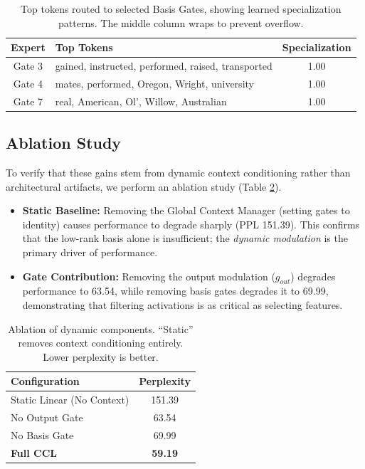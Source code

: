 \documentclass[11pt]{article}
\begin{document}
\begin{table}[t]
\centering
\small %
\caption{Top tokens routed to selected Basis Gates, showing learned specialization patterns. The middle column wraps to prevent overflow.}
\label{tab:gate_specialization}
\begin{tabularx}{\linewidth}{@{} c X c @{}}
\toprule
\textbf{Expert} & \textbf{Top Tokens} & \textbf{Specialization} \\
\midrule
Gate 3 & gained, instructed, performed, raised, transported & 1.00 \\
Gate 4 & mates, performed, Oregon, Wright, university & 1.00 \\
Gate 7 & real, American, Ol', Willow, Australian & 1.00 \\
\bottomrule
\end{tabularx}
\end{table}


\subsection{Ablation Study}
To verify that these gains stem from dynamic context conditioning rather than architectural artifacts, we perform an ablation study (Table \ref{tab:ablation}).
\begin{itemize}
    \item \textbf{Static Baseline:} Removing the Global Context Manager (setting gates to identity) causes performance to degrade sharply (PPL 151.39). This confirms that the low-rank basis alone is insufficient; the \textit{dynamic modulation} is the primary driver of performance.
    \item \textbf{Gate Contribution:} Removing the output modulation ($g_{out}$) degrades performance to 63.54, while removing basis gates degrades it to 69.99, demonstrating that filtering activations is as critical as selecting features.
\end{itemize}

\begin{table}[h]
    \centering
    \caption{Ablation of dynamic components. ``Static'' removes context conditioning entirely. Lower perplexity is better.}
    \begin{tabular}{lc}
        \toprule
        \textbf{Configuration} & \textbf{Perplexity} \\
        \midrule
        Static Linear (No Context) & 151.39 \\
        No Output Gate & 63.54 \\
        No Basis Gate & 69.99 \\
        \textbf{Full CCL} & \textbf{59.19} \\
        \bottomrule
    \end{tabular}
    \label{tab:ablation}
\end{table}
\end{document}
